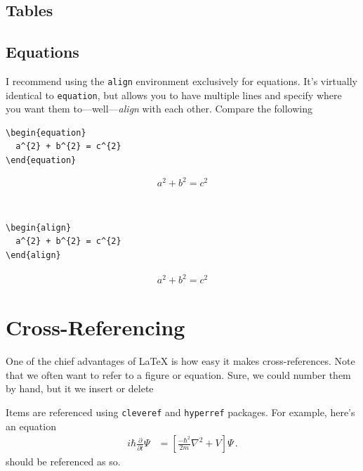 \subsection{Tables}


\subsection{Equations}
I recommend using the \texttt{align} environment exclusively for equations. 
It's virtually identical to \texttt{equation}, but allows you to have multiple lines and specify where you want them to---well---\emph{align} with each other.
Compare the following\\
\begin{minipage}[t]{0.48\textwidth}
\small
\begin{verbatim}
\begin{equation}
  a^{2} + b^{2} = c^{2}
\end{equation}
\end{verbatim}
\begin{equation}
  a^{2} + b^{2} = c^{2}
\end{equation}
\end{minipage}
~
\begin{minipage}[t]{0.48\textwidth}
\small
\begin{verbatim}
\begin{align}
  a^{2} + b^{2} = c^{2}
\end{align}
\end{verbatim}
\begin{align}
  a^{2} + b^{2} = c^{2}
\end{align}
\end{minipage}


\section{Cross-Referencing}
One of the chief advantages of \LaTeX{} is how easy it makes cross-references.
Note that we often want to refer to a figure or equation.
Sure, we could number them by hand, but it we insert or delete 


Items are referenced using \texttt{cleveref} and \texttt{hyperref} packages. For example, here's an equation
\begin{align}
   i\hbar\frac{\partial}{\partial t}\Psi &= \left[ \frac{-\hbar^{2}}{2m}\nabla^{2} + V\right]\Psi\,.
  \label{eqn:SchrodingerEquation}
\end{align}
 should be referenced as so.

